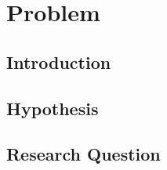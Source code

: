 
\section{Problem}
\subsection{Introduction}

\subsection{Hypothesis}

\subsection{Research Question}
